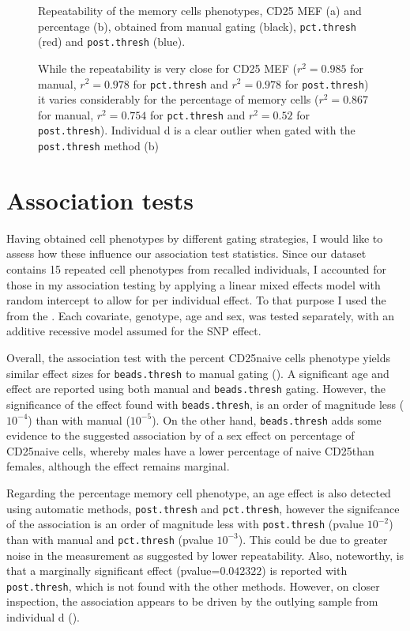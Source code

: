 \begin{figure}
\begin{minipage}{.7\textwidth}
\end{minipage}
{Repeatability of the memory cells phenotypes, CD25 MEF (a) and percentage (b), obtained from manual gating (black), \texttt{pct.thresh} (red) and \texttt{post.thresh} (blue).}
{
  While the repeatability is very close for CD25 MEF
  ($r^2=0.985$ for manual, $r^2=0.978$ for \texttt{pct.thresh} and $r^2=0.978$ for \texttt{post.thresh})
  it varies considerably for the percentage of memory cells
  ($r^2=0.867$ for manual, $r^2=0.754$ for \texttt{pct.thresh} and $r^2=0.52$ for \texttt{post.thresh}).
  Individual d is a clear outlier when gated with the \texttt{post.thresh} method (b)

}
\end{figure}




\section{Association tests}

Having obtained cell phenotypes by different gating strategies, 
I would like to assess how these influence our association test statistics.
Since our dataset contains 15 repeated cell phenotypes from recalled individuals,
I accounted for those in my association testing 
by applying a linear mixed effects model with random intercept to allow for per individual effect.
To that purpose I used the  from the .
Each covariate, genotype, age and sex, was tested separately, with an additive recessive model assumed for the SNP effect.

Overall, the association test with the percent CD25\positive naive cells phenotype yields similar effect sizes for \texttt{beads.thresh} to manual gating ().
A significant age and  effect are reported using both manual and \texttt{beads.thresh} gating.
However, the significance of the  effect found with \texttt{beads.thresh}, is an order of magnitude less ($10^{-4}$) than with manual ($10^{-5}$).
On the other hand, \texttt{beads.thresh} adds some evidence to the suggested association by \citet{Dendrou:2009dv} of a sex effect on percentage of CD25\positive naive cells,
whereby males have a lower percentage of naive CD25\positive than females, although the effect remains marginal.

Regarding the percentage memory cell phenotype,
an age effect is also detected using automatic methods, \texttt{post.thresh} and \texttt{pct.thresh}, however the signifcance of the association 
is an order of magnitude less with \texttt{post.thresh} (pvalue $10^{-2}$) than with manual and \texttt{pct.thresh} (pvalue $10^{-3}$).
This could be due to greater noise in the measurement as suggested by lower repeatability.
Also, noteworthy, is that a marginally significant  effect (pvalue=$0.042322$) is reported with \texttt{post.thresh}, which is not found with the
other methods.  
However, on closer inspection, the association appears to be driven by the outlying sample from individual d ().

